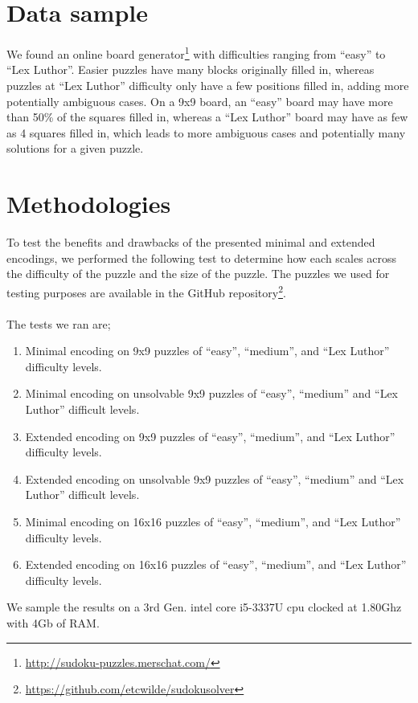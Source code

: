 \documentclass[conference,draftclsnofoot]{IEEEtran}
\begin{document}
\section{Data sample}
We found an online board
generator\footnote{\url{http://sudoku-puzzles.merschat.com/}} with difficulties
ranging from ``easy'' to ``Lex Luthor''. Easier puzzles have many blocks
originally filled in, whereas puzzles at ``Lex Luthor'' difficulty only have a
few positions filled in, adding more potentially ambiguous cases. On a 9x9
board, an ``easy'' board may have more than 50\% of the squares filled in,
whereas a ``Lex Luthor'' board may have as few as 4 squares filled in, which
leads to more ambiguous cases and potentially many solutions for a given
puzzle.

\section{Methodologies}
To test the benefits and drawbacks of the presented minimal and extended
encodings, we performed the following test to determine how each scales across
the difficulty of the puzzle and the size of the puzzle. The puzzles we used
for testing purposes are available in the GitHub
repository\footnote{\url{https://github.com/etcwilde/sudokusolver}}.\\

\\
The tests we ran are;
\begin{enumerate}
	\item Minimal encoding on 9x9 puzzles of ``easy'', ``medium'', and
		``Lex Luthor'' difficulty levels.
	\item Minimal encoding on unsolvable 9x9 puzzles of ``easy'',
		``medium'' and ``Lex Luthor'' difficult levels.
	\item Extended encoding on 9x9 puzzles of ``easy'', ``medium'', and
		``Lex Luthor'' difficulty levels.
	\item Extended encoding on unsolvable 9x9 puzzles of ``easy'',
		``medium'' and ``Lex Luthor'' difficult levels.
	\item Minimal encoding on 16x16 puzzles of
		``easy'', ``medium'', and ``Lex Luthor'' difficulty levels.
	\item Extended encoding	on 16x16 puzzles of
		``easy'', ``medium'', and ``Lex Luthor'' difficulty levels.
\end{enumerate}

We sample the results on a 3rd Gen. intel core i5-3337U cpu clocked at 1.80Ghz
with 4Gb of RAM.
\end{document}
